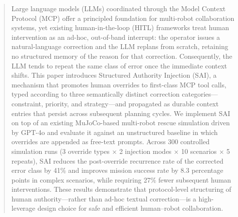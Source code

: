 \documentclass[sigconf,natbib=false]{acmart}
\begin{document}
\begin{abstract}
Large language models (LLMs) coordinated through the Model Context Protocol (MCP) offer a principled foundation for multi-robot collaboration systems, yet existing human-in-the-loop (HITL) frameworks treat human intervention as an ad-hoc, out-of-band interrupt: the operator issues a natural-language correction and the LLM replans from scratch, retaining no structured memory of the reason for that correction. Consequently, the LLM tends to repeat the same class of error once the immediate context shifts. This paper introduces Structured Authority Injection (SAI), a mechanism that promotes human overrides to first-class MCP tool calls, typed according to three semantically distinct correction categories—constraint, priority, and strategy—and propagated as durable context entries that persist across subsequent planning cycles. We implement SAI on top of an existing MuJoCo-based multi-robot rescue simulation driven by GPT-4o and evaluate it against an unstructured baseline in which overrides are appended as free-text prompts. Across 300 controlled simulation runs (3 override types × 2 injection modes × 10 scenarios × 5 repeats), SAI reduces the post-override recurrence rate of the corrected error class by 41\% and improves mission success rate by 8.3 percentage points in complex scenarios, while requiring 27\% fewer subsequent human interventions. These results demonstrate that protocol-level structuring of human authority—rather than ad-hoc textual correction—is a high-leverage design choice for safe and efficient human–robot collaboration.

\end{abstract}
%


\maketitle




%
%
\printbibliography
\end{document}
